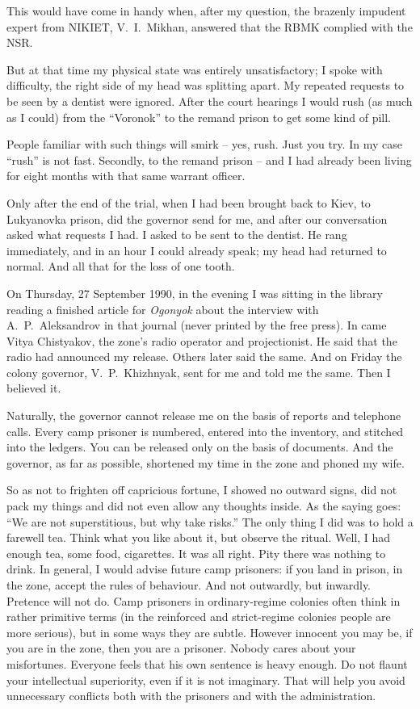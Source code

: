 \documentclass[openright]{bookest}
\begin{document}
This would have come in handy when, after my question, the brazenly impudent expert from NIKIET, V.~I.~Mikhan, answered that the RBMK complied with the NSR.

But at that time my physical state was entirely unsatisfactory; I spoke with difficulty, the right side of my head was splitting apart. My repeated requests to be seen by a dentist were ignored. After the court hearings I would rush (as much as I could) from the ``Voronok'' to the remand prison to get some kind of pill.

People familiar with such things will smirk -- yes, rush. Just you try. In my case ``rush'' is not fast. Secondly, to the remand prison -- and I had already been living for eight months with that same warrant officer.

Only after the end of the trial, when I had been brought back to Kiev, to Lukyanovka prison, did the governor send for me, and after our conversation asked what requests I had. I asked to be sent to the dentist. He rang immediately, and in an hour I could already speak; my head had returned to normal. And all that for the loss of one tooth.

On Thursday, 27 September 1990, in the evening I was sitting in the library reading a finished article for \textit{Ogonyok} about the interview with A.~P.~Aleksandrov in that journal (never printed by the free press). In came Vitya Chistyakov, the zone's radio operator and projectionist. He said that the radio had announced my release. Others later said the same. And on Friday the colony governor, V.~P.~Khizhnyak, sent for me and told me the same. Then I believed it.

Naturally, the governor cannot release me on the basis of reports and telephone calls. Every camp prisoner is numbered, entered into the inventory, and stitched into the ledgers. You can be released only on the basis of documents. And the governor, as far as possible, shortened my time in the zone and phoned my wife.


So as not to frighten off capricious fortune, I showed no outward signs, did not pack my things and did not even allow any thoughts inside. As the saying goes: ``We are not superstitious, but why take risks.'' The only thing I did was to hold a farewell tea. Think what you like about it, but observe the ritual. Well, I had enough tea, some food, cigarettes. It was all right. Pity there was nothing to drink. In general, I would advise future camp prisoners: if you land in prison, in the zone, accept the rules of behaviour. And not outwardly, but inwardly. Pretence will not do. Camp prisoners in ordinary-regime colonies often think in rather primitive terms (in the reinforced and strict-regime colonies people are more serious), but in some ways they are subtle. However innocent you may be, if you are in the zone, then you are a prisoner. Nobody cares about your misfortunes. Everyone feels that his own sentence is heavy enough. Do not flaunt your intellectual superiority, even if it is not imaginary. That will help you avoid unnecessary conflicts both with the prisoners and with the administration.
\end{document}
